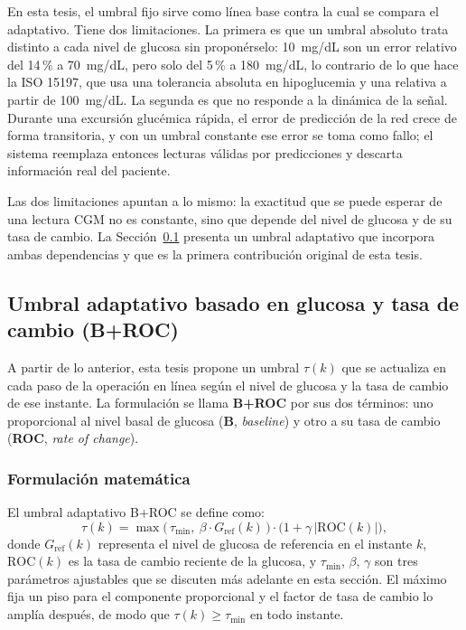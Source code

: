 \documentclass{report}
\begin{document}
En esta tesis, el umbral fijo sirve como línea base contra la cual se compara el adaptativo. Tiene dos limitaciones. La primera es que un umbral absoluto trata distinto a cada nivel de glucosa sin proponérselo: 10~mg/dL son un error relativo del 14\,\% a 70~mg/dL, pero solo del 5\,\% a 180~mg/dL, lo contrario de lo que hace la ISO 15197, que usa una tolerancia absoluta en hipoglucemia y una relativa a partir de 100~mg/dL. La segunda es que no responde a la dinámica de la señal. Durante una excursión glucémica rápida, el error de predicción de la red crece de forma transitoria, y con un umbral constante ese error se toma como fallo; el sistema reemplaza entonces lecturas válidas por predicciones y descarta información real del paciente.

Las dos limitaciones apuntan a lo mismo: la exactitud que se puede esperar de una lectura CGM no es constante, sino que depende del nivel de glucosa y de su tasa de cambio. La Sección~\ref{subsec:umbral_adaptativo} presenta un umbral adaptativo que incorpora ambas dependencias y que es la primera contribución original de esta tesis.

\subsection{Umbral adaptativo basado en glucosa y tasa de cambio (B+ROC)}
\label{subsec:umbral_adaptativo}

A partir de lo anterior, esta tesis propone un umbral $\tau(k)$ que se actualiza en cada paso de la operación en línea según el nivel de glucosa y la tasa de cambio de ese instante. La formulación se llama \textbf{B+ROC} por sus dos términos: uno proporcional al nivel basal de glucosa (\textbf{B}, \textit{baseline}) y otro a su tasa de cambio (\textbf{ROC}, \textit{rate of change}).

\subsubsection{Formulación matemática}
\label{subsec:formulacion_adaptativa}

El umbral adaptativo B+ROC se define como:
\begin{equation}
\label{eq:umbral_adaptativo}
\tau(k) = \max\!\big(\, \tau_{\min},\ \beta \cdot G_{\mathrm{ref}}(k) \,\big) \cdot \big(1 + \gamma\,|\mathrm{ROC}(k)|\big),
\end{equation}
donde $G_{\mathrm{ref}}(k)$ representa el nivel de glucosa de referencia en el instante $k$, $\mathrm{ROC}(k)$ es la tasa de cambio reciente de la glucosa, y $\tau_{\min}$, $\beta$, $\gamma$ son tres parámetros ajustables que se discuten más adelante en esta sección. El máximo fija un piso para el componente proporcional y el factor de tasa de cambio lo amplía después, de modo que $\tau(k) \geq \tau_{\min}$ en todo instante.
\end{document}
